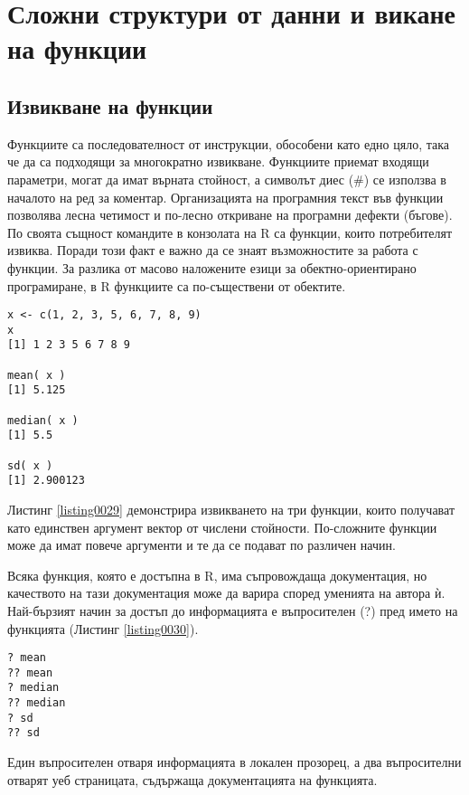 ﻿\newpage
\chapter{Сложни структури от данни и викане на функции}
\label{chapter03}

\section{Извикване на функции}

Функциите са последователност от инструкции, обособени като едно цяло, така че да са подходящи за многократно извикване. Функциите приемат входящи параметри, могат да имат върната стойност, а символът диес (\#) се използва в началото на ред за коментар. Организацията на програмния текст във функции позволява лесна четимост и по-лесно откриване на програмни дефекти (бъгове). По своята същност командите в конзолата на R са функции, които потребителят извиква. Поради този факт е важно да се знаят възможностите за работа с функции. За разлика от масово наложените езици за обектно-ориентирано програмиране, в R функциите са по-съществени от обектите.

\begin{lstlisting}[caption=Извикване на функции, label=listing0029]
x <- c(1, 2, 3, 5, 6, 7, 8, 9)
x
[1] 1 2 3 5 6 7 8 9

mean( x )
[1] 5.125

median( x )
[1] 5.5

sd( x )
[1] 2.900123
\end{lstlisting}

Листинг \ref{listing0029} демонстрира извикването на три функции, които получават като единствен аргумент вектор от числени стойности. По-сложните функции може да имат повече аргументи и те да се подават по различен начин. 

Всяка функция, която е достъпна в R, има съпровождаща документация, но качеството на тази документация може да варира според уменията на автора ѝ. Най-бързият начин за достъп до информацията е въпросителен (?) пред името на функцията (Листинг \ref{listing0030}).

\begin{lstlisting}[caption=Документация за функциите, label=listing0030]
? mean
?? mean
? median
?? median
? sd
?? sd
\end{lstlisting}

Един въпросителен отваря информацията в локален прозорец, а два въпросителни отварят уеб страницата, съдържаща документацията на функцията.

